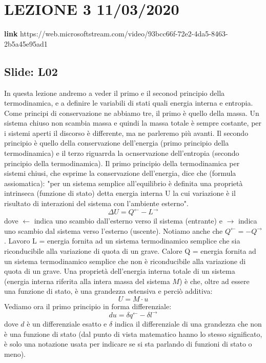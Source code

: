 \section{LEZIONE 3 11/03/2020}
\textbf{link} https://web.microsoftstream.com/video/93bcc66f-72e2-4da5-8463-2b5a45e95ad1
\subsection{Slide: L02}
In questa lezione andremo a veder il primo e il seconod principio della termodinamica, e a definire le variabili di stati quali energia interna e entropia.\newline
Come principi di conservazione ne abbiamo tre, il primo è quello della massa. Un sistema chiuso non scambia massa e quindi la massa totale è sempre costante, per i sistemi aperti il discorso è differente, ma ne parleremo più avanti. Il secondo principio è quello della conservazione dell'energia (primo principio della termodinamica) e il terzo riguarrda la ocnservazione dell'entropia (secondo principio della termodinamica).\newline
Il primo principio della termodinamica per sistemi chiusi, che esprime la conservazione dell'energia, dice che (formula assiomatica): "per un sistema semplice all'equilibrio è definita una proprietà intrinseca (funzione di stato) detta energia interna U la cui variazione è il risultato di interazioni del sistema con l'ambiente esterno".
\[
    \Delta U = Q^{\leftarrow} - L^{\rightarrow}
\]
dove $\leftarrow$ indica uno scambio dall'esterno verso il sistema (entrante) e $\rightarrow$ indica uno scambio dal sistema verso l'esterno (uscente).\newline
Notiamo anche che $Q^{\leftarrow} = -Q^{\rightarrow}$.
Lavoro L = energia fornita ad un sistema termodinamico semplice che sia riconducibile alla variazione di quota di un grave.\newline
Calore Q = energia fornita ad un sistema termodinamico semplice che non è riconducibile alla variazione di quota di un grave.\newline
Una proprietà dell'energia interna totale di un sistema (energia interna riferita alla intera massa del sistema $M$) è che, oltre ad essere una funzione di stato, è una grandezza estensiva e perciò additiva: 
\[
    U = M \cdot u
\]
Vediamo ora il primo principio in forma differenziale:
\[
    du =  \delta q^{\leftarrow } - \delta l^{\rightarrow }
\]
dove $d$ è un differenziale esatto e $\delta$ indica il differenziale di una grandezza che non è una funzione di stato (dal punto di vista matematico hanno lo stesso significato, è solo una notazione usata per indicare se si sta parlando di funzioni di stato o meno).\newline
